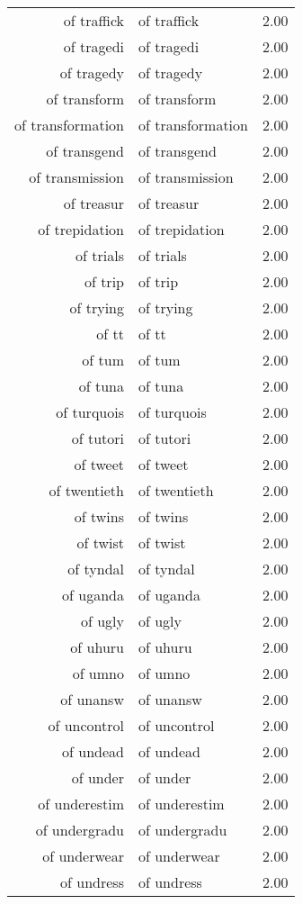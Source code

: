 \begin{table}[ht]
\begin{tabular}{rlr}
  of traffick & of traffick & 2.00 \\ 
  of tragedi & of tragedi & 2.00 \\ 
  of tragedy & of tragedy & 2.00 \\ 
  of transform & of transform & 2.00 \\ 
  of transformation & of transformation & 2.00 \\ 
  of transgend & of transgend & 2.00 \\ 
  of transmission & of transmission & 2.00 \\ 
  of treasur & of treasur & 2.00 \\ 
  of trepidation & of trepidation & 2.00 \\ 
  of trials & of trials & 2.00 \\ 
  of trip & of trip & 2.00 \\ 
  of trying & of trying & 2.00 \\ 
  of tt & of tt & 2.00 \\ 
  of tum & of tum & 2.00 \\ 
  of tuna & of tuna & 2.00 \\ 
  of turquois & of turquois & 2.00 \\ 
  of tutori & of tutori & 2.00 \\ 
  of tweet & of tweet & 2.00 \\ 
  of twentieth & of twentieth & 2.00 \\ 
  of twins & of twins & 2.00 \\ 
  of twist & of twist & 2.00 \\ 
  of tyndal & of tyndal & 2.00 \\ 
  of uganda & of uganda & 2.00 \\ 
  of ugly & of ugly & 2.00 \\ 
  of uhuru & of uhuru & 2.00 \\ 
  of umno & of umno & 2.00 \\ 
  of unansw & of unansw & 2.00 \\ 
  of uncontrol & of uncontrol & 2.00 \\ 
  of undead & of undead & 2.00 \\ 
  of under & of under & 2.00 \\ 
  of underestim & of underestim & 2.00 \\ 
  of undergradu & of undergradu & 2.00 \\ 
  of underwear & of underwear & 2.00 \\ 
  of undress & of undress & 2.00 \\ 

\end{tabular}
\end{table}
